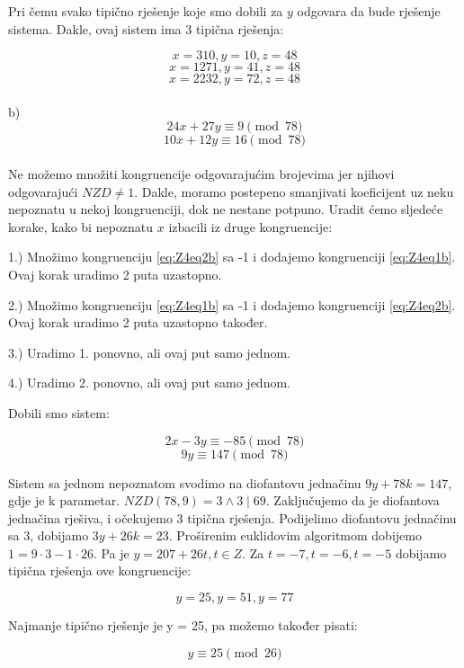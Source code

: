\documentclass[12pt]{article}
\begin{document}
Pri čemu svako tipično rješenje koje smo dobili za $y$ odgovara da bude rješenje sistema. Dakle, ovaj sistem ima 3 tipična rješenja:

$$x = 310, y = 10, z = 48$$ 
$$x = 1271, y = 41, z = 48$$
$$x = 2232, y = 72, z = 48$$\vspace{1mm}
\\
b)
\[
24x + 27y \equiv 9 \pmod{78} \label{eq:Z4eq1b} \tag{1}
\]
\[
10x + 12y \equiv 16 \pmod{78} \label{eq:Z4eq2b} \tag{2}
\]
\\

Ne možemo množiti kongruencije odgovarajućim brojevima jer njihovi odgovarajući $NZD \neq 1$. Dakle, moramo postepeno smanjivati koeficijent uz neku nepoznatu u nekoj kongruenciji, dok ne nestane potpuno. Uradit ćemo sljedeće korake, kako bi nepoznatu $x$ izbacili iz druge kongruencije:\vspace{1mm}

\begin{center}
1.) Množimo kongruenciju \ref{eq:Z4eq2b} sa -1 i dodajemo kongruenciji \ref{eq:Z4eq1b}. Ovaj korak uradimo 2 puta uzastopno.


2.) Množimo kongruenciju \ref{eq:Z4eq1b} sa -1 i dodajemo kongruenciji \ref{eq:Z4eq2b}. Ovaj korak uradimo 2 puta uzastopno također.


3.) Uradimo 1. ponovno, ali ovaj put samo jednom.


4.) Uradimo 2. ponovno, ali ovaj put samo jednom.
\end{center}

Dobili smo sistem:

$$2x - 3y \equiv -85 \pmod{78}$$
$$9y \equiv 147 \pmod{78}$$\vspace{1mm}

Sistem sa jednom nepoznatom svodimo na diofantovu jednačinu $9y + 78k = 147$, gdje je k parametar. $NZD(78, 9) = 3 \land 3 \mid 69$. Zaključujemo da je diofantova jednačina rješiva, i očekujemo 3 tipična rješenja. Podijelimo diofantovu jednačinu sa 3, dobijamo $3y + 26k = 23$. Proširenim euklidovim algoritmom dobijemo $1 = 9 \cdot 3 - 1 \cdot 26$. Pa je $y = 207 + 26t, t \in Z$. Za $t = -7, t = -6, t = -5$ dobijamo tipična rješenja ove kongruencije:

$$y = 25, y = 51, y = 77$$\vspace{1mm}

Najmanje tipično rješenje je y = 25, pa možemo također pisati:

$$y \equiv 25 \pmod{26}$$ \vspace{1mm}
\end{document}
